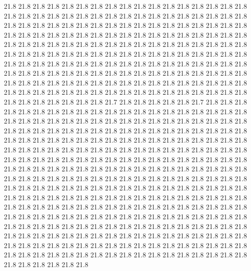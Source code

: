 21.8
21.8
21.8
21.8
21.8
21.8
21.8
21.8
21.8
21.8
21.8
21.8
21.8
21.8
21.8
21.8
21.8
21.8
21.8
21.8
21.8
21.8
21.8
21.8
21.8
21.8
21.8
21.8
21.8
21.8
21.8
21.8
21.8
21.8
21.8
21.8
21.8
21.8
21.8
21.8
21.8
21.8
21.8
21.8
21.8
21.8
21.8
21.8
21.8
21.8
21.8
21.8
21.8
21.8
21.8
21.8
21.8
21.8
21.8
21.8
21.8
21.8
21.8
21.8
21.8
21.8
21.8
21.8
21.8
21.8
21.8
21.8
21.8
21.8
21.8
21.8
21.8
21.8
21.8
21.8
21.8
21.8
21.8
21.8
21.8
21.8
21.8
21.8
21.8
21.8
21.8
21.8
21.8
21.8
21.8
21.8
21.8
21.8
21.8
21.8
21.8
21.8
21.8
21.8
21.8
21.8
21.8
21.8
21.8
21.8
21.8
21.8
21.8
21.8
21.8
21.8
21.8
21.8
21.8
21.8
21.8
21.8
21.8
21.8
21.8
21.8
21.8
21.8
21.8
21.8
21.8
21.8
21.8
21.8
21.8
21.8
21.8
21.8
21.8
21.8
21.8
21.8
21.8
21.8
21.8
21.8
21.8
21.8
21.8
21.8
21.8
21.8
21.8
21.8
21.8
21.8
21.8
21.8
21.8
21.8
21.8
21.8
21.8
21.8
21.8
21.8
21.8
21.8
21.8
21.8
21.8
21.8
21.8
21.8
21.8
21.8
21.8
21.7
21.8
21.8
21.8
21.8
21.8
21.7
21.8
21.8
21.8
21.8
21.8
21.8
21.8
21.8
21.8
21.8
21.8
21.8
21.8
21.8
21.8
21.8
21.8
21.8
21.8
21.8
21.8
21.8
21.8
21.8
21.8
21.8
21.8
21.8
21.8
21.8
21.8
21.8
21.8
21.8
21.8
21.8
21.8
21.8
21.8
21.8
21.8
21.8
21.8
21.8
21.8
21.8
21.8
21.8
21.8
21.8
21.8
21.8
21.8
21.8
21.8
21.8
21.8
21.8
21.8
21.8
21.8
21.8
21.8
21.8
21.8
21.8
21.8
21.8
21.8
21.8
21.8
21.8
21.8
21.8
21.8
21.8
21.8
21.8
21.8
21.8
21.8
21.8
21.8
21.8
21.8
21.8
21.8
21.8
21.8
21.8
21.8
21.8
21.8
21.8
21.8
21.8
21.8
21.8
21.8
21.8
21.8
21.8
21.8
21.8
21.8
21.8
21.8
21.8
21.8
21.8
21.8
21.8
21.8
21.8
21.8
21.8
21.8
21.8
21.8
21.8
21.8
21.8
21.8
21.8
21.8
21.8
21.8
21.8
21.8
21.8
21.8
21.8
21.8
21.8
21.8
21.8
21.8
21.8
21.8
21.8
21.8
21.8
21.8
21.8
21.8
21.8
21.8
21.8
21.8
21.8
21.8
21.8
21.8
21.8
21.8
21.8
21.8
21.8
21.8
21.8
21.8
21.8
21.8
21.8
21.8
21.8
21.8
21.8
21.8
21.8
21.8
21.8
21.8
21.8
21.8
21.8
21.8
21.8
21.8
21.8
21.8
21.8
21.8
21.8
21.8
21.8
21.8
21.8
21.8
21.8
21.8
21.8
21.8
21.8
21.8
21.8
21.8
21.8
21.8
21.8
21.8
21.8
21.8
21.8
21.8
21.8
21.8
21.8
21.8
21.8
21.8
21.8
21.8
21.8
21.8
21.8
21.8
21.8
21.8
21.8
21.8
21.8
21.8
21.8
21.8
21.8
21.8
21.8
21.8
21.8
21.8
21.8
21.8
21.8
21.8
21.8
21.8
21.8
21.8
21.8
21.8
21.8
21.8
21.8
21.8
21.8
21.8
21.8
21.8
21.8
21.8
21.8
21.8
21.8
21.8
21.8
21.8
21.8
21.8
21.8
21.8
21.8
21.8
21.8
21.8
21.8
21.8
21.8
21.8
21.8
21.8
21.8
21.8
21.8
21.8
21.8
21.8
21.8
21.8
21.8
21.8
